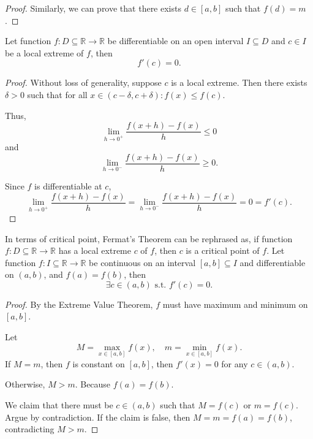 \documentclass[a4paper,12pt]{report}
\begin{document}
\begin{itemize}
\begin{itemize}
\begin{proof}
Similarly, we can prove that there exists $d\in [a,b]$ such that $f(d)=m$.
\end{proof}
Let function $f\colon D\subseteq\mathbb{R}\to\mathbb{R}$ be differentiable on an open interval $I\subseteq D$ and $c\in I$ be a local extreme of $f$, then
\[f'(c)=0.\]
\begin{proof}
Without loss of generality, suppose $c$ is a local extreme. Then there exists $\delta>0$ such that for all $x\in (c-\delta,c+\delta)\colon f(x)\leq f(c)$.

Thus,
\[\lim_{h\to 0^+}\frac{f(x+h)-f(x)}{h}\leq 0\]
and
\[\lim_{h\to 0^-}\frac{f(x+h)-f(x)}{h}\geq 0.\]

Since $f$ is differentiable at $c$,
\[\lim_{h\to 0^+}\frac{f(x+h)-f(x)}{h}=\lim_{h\to 0^-}\frac{f(x+h)-f(x)}{h}=0=f'(c).\]
\end{proof}
In terms of critical point, Fermat's Theorem can be rephrased as, if function $f\colon D\subseteq\mathbb{R}\to\mathbb{R}$ has a local extreme $c$ of $f$, then $c$ is a critical point of $f$.
Let function $f\colon I\subseteq\mathbb{R}\to\mathbb{R}$ be continuous on an interval $[a, b]\subseteq I$ and differentiable on $(a,b)$, and $f(a)=f(b)$, then
\[\exists c\in (a, b)\text{\ s.t.\ }f'(c)=0.\]
\begin{proof}
By the Extreme Value Theorem, $f$ must have maximum and minimum on $[a,b]$.

Let
\[M=\max_{x\in [a,b]}f(x),\quad m=\min_{x\in [a,b]}f(x).\]
If $M=m$, then $f$ is constant on $[a,b]$, then $f'(x)=0$ for any $c\in (a,b)$.

Otherwise, $M>m$. Because $f(a)=f(b)$. 

We claim that there must be $c\in (a,b)$ such that $M=f(c)$ or $m=f(c)$. Argue by contradiction. If the claim is false, then $M=m=f(a)=f(b)$, contradicting $M>m$.


\end{proof}
\end{itemize}
\end{itemize}
\end{document}
